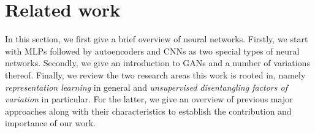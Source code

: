 \documentclass[12pt,a4paper]{article}
\begin{document}
\section{Related work}
In this section, we first give a brief overview of neural networks. Firstly, we start with MLPs followed by autoencoders and CNNs as two special types of neural networks. Secondly, we give an introduction to GANs and a number of variations thereof. Finally, we review the two research areas this work is rooted in, namely \textit{representation learning} in general and \textit{unsupervised disentangling factors of variation} in particular. For the latter, we give an overview of previous major approaches along with their characteristics to establish the contribution and importance of our work.
\end{document}

